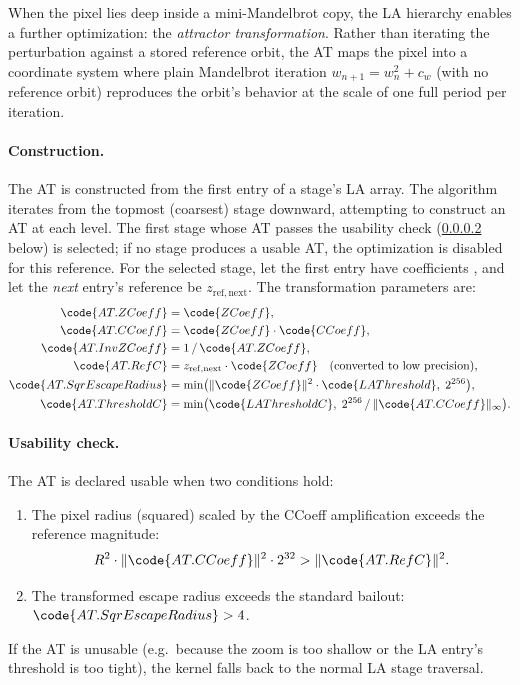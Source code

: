 When the pixel lies deep inside a mini-Mandelbrot copy, the LA hierarchy
enables a further optimization: the \emph{attractor transformation}.
Rather than iterating the perturbation against a stored reference orbit,
the AT maps the pixel into a coordinate system where plain Mandelbrot
iteration \(w_{n+1} = w_n^2 + c_w\) (with no reference orbit) reproduces
the orbit's behavior at the scale of one full period per iteration.

\paragraph{Construction.}
The AT is constructed from the first entry of a stage's LA array.
The algorithm iterates from the topmost (coarsest) stage downward,
attempting to construct an AT at each level.  The first stage whose
AT passes the usability check (\cref{sec:at-usability} below) is
selected; if no stage produces a usable AT, the optimization is
disabled for this reference.  For the selected stage, let the first
entry have coefficients ,  and let the
\emph{next} entry's reference be \(z_\mathrm{ref,next}\).  The
transformation parameters are:
\begin{align}
\code{AT.ZCoeff}   &= \code{ZCoeff}, \\
\code{AT.CCoeff}   &= \code{ZCoeff} \cdot \code{CCoeff}, \\
\code{AT.InvZCoeff}&= 1 \,/\, \code{AT.ZCoeff}, \\
\code{AT.RefC}     &= z_\mathrm{ref,next} \cdot \code{ZCoeff}
  \quad\text{(converted to low precision)}, \\
\code{AT.SqrEscapeRadius} &= \min\bigl(
      \lVert\code{ZCoeff}\rVert^2 \cdot \code{LAThreshold},\;
      2^{256}\bigr), \\
\code{AT.ThresholdC} &= \min\bigl(
      \code{LAThresholdC},\;
      2^{256} \,/\, \lVert\code{AT.CCoeff}\rVert_\infty\bigr).
\end{align}

\paragraph{Usability check.}
\label{sec:at-usability}
The AT is declared usable when two conditions hold:
\begin{enumerate}
  \item The pixel radius (squared) scaled by the CCoeff amplification
        exceeds the reference magnitude:
        \[
        R^2 \cdot \lVert\code{AT.CCoeff}\rVert^2 \cdot 2^{32}
          > \lVert\code{AT.RefC}\rVert^2.
        \]
  \item The transformed escape radius exceeds the standard bailout:
        \(\code{AT.SqrEscapeRadius} > 4\).
\end{enumerate}
If the AT is unusable (e.g.\ because the zoom is too shallow or the
LA entry's threshold is too tight), the kernel falls back to the
normal LA stage traversal.

